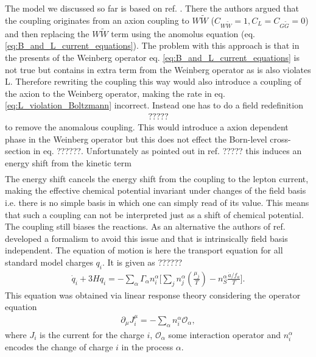 \documentclass[13pt,a4paper,twoside,titlepage]{article}
\begin{document}
The model we discussed so far is based on ref. \cite{Axion_leptogenesis_Kusenko_2015}.
There the authors argued that the coupling originates from an axion coupling to $W \tilde{W}$ ($C_{W \tilde{W}} = 1, C_L = C_{G \tilde{G}} = 0$) and then replacing the $W \tilde{W}$ term using
the anomolus equation (eq. \eqref{eq:B_and_L_current_equations}).
The problem with this approach is that in the presents of the Weinberg operator eq. \eqref{eq:B_and_L_current_equations} is not true but contains in extra term from the Weinberg operator as
is also violates L. Therefore rewriting the coupling this way would also introduce a coupling of
the axion to the Weinberg operator, making the rate in eq. \eqref{eq:L_violation_Boltzmann} incorrect.
Instead one has to do a field redefinition
\begin{align}
    ?????
\end{align}
to remove the anomalous coupling. This would  introduce a axion dependent phase in the Weinberg operator
but this does not effect the Born-level cross-section in eq. ??????.
Unfortunately as pointed out in ref. ????? this induces an energy shift from the kinetic term
\begin{align}
\end{align}
The energy shift cancels the energy shift from the coupling to the lepton current, making the effective
chemical potential invariant under changes of the field basis i.e. there is no simple basis in which
one can simply read of its value.
This means that such a coupling can not be interpreted just as a shift of chemical potential.
The coupling still biases the reactions.
As an alternative the authors of ref. \cite{Domcke:2020kcp_Generic_Couplings} developed a formalism
to avoid this issue and that is intrinsically field basis independent.
The equation of motion is here the transport equation for all standard model charges $q_i$.
It is
given as ??????
\begin{align}
\label{eq:transport_equation}
\dot{q}_i + 3 H q_i = - \sum_\alpha \Gamma_\alpha n^\alpha_i \Big[
\sum_j n^\alpha_j \left( \frac{\mu_j}{T} \right) - n_S^\alpha \frac{\dot{a} / f_a}{T} \Big].
\end{align}
This equation was obtained via linear response theory considering the operator equation
\begin{align}
    \partial_\mu J^\mu_i = - \sum_\alpha n^\alpha_i \mathcal{O}_\alpha,
\end{align}
where $J_i$ is the current for the charge $i$, $\mathcal{O}_\alpha$ some interaction operator and
$n^\alpha_i$ encodes the change of charge $i$ in the process $\alpha$.
\end{document}
